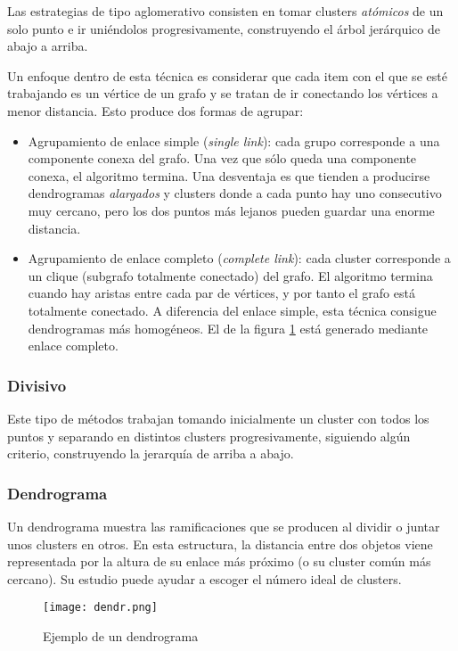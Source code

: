 \documentclass[a4paper,11pt,spanish]{report}
\let\stdsubsub\subsubsection
\renewcommand{\subsection}{\stdsubsub}
\begin{document}
Las estrategias de tipo aglomerativo consisten en tomar clusters \emph{atómicos} de un solo punto e ir uniéndolos progresivamente, construyendo el árbol jerárquico de abajo a arriba.

Un enfoque dentro de esta técnica es considerar que cada item con el que se esté trabajando es un vértice de un grafo y se tratan de ir conectando los vértices a menor distancia. Esto produce dos formas de agrupar:
\begin{itemize}
\item Agrupamiento de enlace simple (\emph{single link}): cada grupo corresponde a una componente conexa del grafo. Una vez que sólo queda una componente conexa, el algoritmo termina. Una desventaja es que tienden a producirse dendrogramas \emph{alargados} y clusters donde a cada punto hay uno consecutivo muy cercano, pero los dos puntos más lejanos pueden guardar una enorme distancia.
\item Agrupamiento de enlace completo (\emph{complete link}): cada cluster corresponde a un clique (subgrafo totalmente conectado) del grafo. El algoritmo termina cuando hay aristas entre cada par de vértices, y por tanto el grafo está totalmente conectado. A diferencia del enlace simple, esta técnica consigue dendrogramas más homogéneos. El de la figura \ref{fig.dendr} está generado mediante enlace completo.
\end{itemize}

\subsection*{Divisivo}
\label{sec-1-3-2-2}

Este tipo de métodos trabajan tomando inicialmente un cluster con todos los puntos y separando en distintos clusters progresivamente, siguiendo algún criterio, construyendo la jerarquía de arriba a abajo.

\subsection*{Dendrograma}
\label{sec-1-3-2-3}

Un dendrograma muestra las ramificaciones que se producen al dividir o juntar unos clusters en otros. En esta estructura, la distancia entre dos objetos viene representada por la altura de su enlace más próximo (o su cluster común más cercano). Su estudio puede ayudar a escoger el número ideal de clusters.

\begin{figure}[htbp]
\centering
\texttt{[image: dendr.png]}
\caption{\label{fig.dendr}Ejemplo de un dendrograma}
\end{figure}
\end{document}
